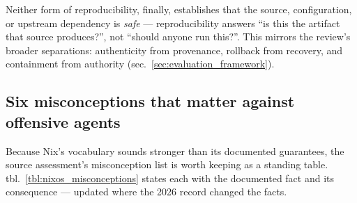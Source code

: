 \documentclass[
  english,
  9pt,
]{extarticle}
\begin{document}
Neither form of reproducibility, finally, establishes that the source,
configuration, or upstream dependency is \emph{safe} --- reproducibility
answers ``is this the artifact that source produces?'', not ``should
anyone run this?''. This mirrors the review's broader separations:
authenticity from provenance, rollback from recovery, and containment
from authority (sec.~\ref{sec:evaluation_framework}).

\subsection{Six misconceptions that matter against offensive
agents}\label{six-misconceptions-that-matter-against-offensive-agents}

Because Nix's vocabulary sounds stronger than its documented guarantees,
the source assessment's misconception list is worth keeping as a
standing table. tbl.~\ref{tbl:nixos_misconceptions} states each with the
documented fact and its consequence --- updated where the 2026 record
changed the facts.
\end{document}
